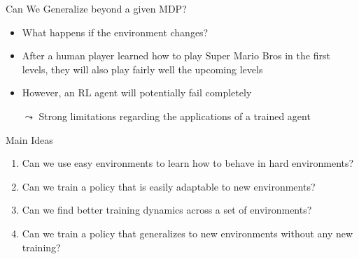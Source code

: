 \documentclass[aspectratio=169]{../latex_main/tntbeamer}  %
\begin{document}
\begin{frame}[c]{Can We Generalize beyond a given MDP?}
	
	\begin{itemize}
		\item What happens if the environment changes?
		\smallskip
		\item After a human player learned how to play Super Mario Bros in the first levels, they will also play fairly well the upcoming levels
		\item However, an RL agent will potentially  fail completely
		\item[$\leadsto$] Strong limitations regarding the applications of a trained agent
	\end{itemize}
	
\end{frame}
\begin{frame}[c]{Main Ideas}
	
	\begin{enumerate}
		\item Can we use easy environments to learn how to behave in hard environments?
		\pause
		\item Can we train a policy that is easily adaptable to new environments?
		\pause
		\item Can we find better training dynamics across a set of environments?
		\pause
		\item Can we train a policy that generalizes to new environments without any new training?
	\end{enumerate}

			
\end{frame}
\end{document}
